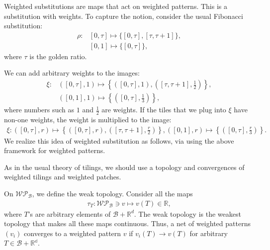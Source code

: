 \documentclass[a4]{amsart}
\newcommand{\WP}{\mathcal{W}\mathcal{P}}
\theoremstyle{definition}
\begin{document}
{\color{blue}Weighted substitutions
are maps that act on weighted patterns.
This is a substitution with weights.
To capture the notion, consider the
usual Fibonacci substitution:
\begin{align*}
    \rho\colon &[0,\tau]\mapsto \{[0,\tau],[\tau,\tau+1]\},\\
    &[0,1]\mapsto\{[0,\tau]\},
\end{align*}
where $\tau$ is the golden ratio.

We can add arbitrary weights to the images:
\begin{align*}
    \xi\colon &([0,\tau],1)\mapsto \left\{\left([0,\tau],1\right),\left([\tau,\tau+1],\frac{1}{2}\right)\right\},\\
    &([0,1],1)\mapsto\left\{\left([0,\tau],\frac{1}{3}\right)\right\},
\end{align*}
where numbers such as $1$ and $\frac{1}{2}$
are weights. If the tiles that we plug into
$\xi$ have non-one weights, the weight is
multiplied  to the image:
\begin{align}
    \xi\colon ([0,\tau],r)\mapsto \left\{\left([0,\tau],r\right),\left([\tau,\tau+1],\frac{r}{2}\right)\right\},
    ([0,1],r)\mapsto\left\{\left([0,\tau],\frac{r}{3}\right)\right\}.
    \label{eq_weighted_Fibonacci}
\end{align}
We realize this idea of weighted substitution as follows, via using the above
framework for weighted patterns. 

As in the usual theory of tilings,
we should use a topology and convergences
of weighted tilings and weighted patches.}
On $\WP_{\mathcal{B}}$, we define the weak topology. Consider all the maps
\begin{align*}
    \tau_{T}\colon \WP_{\mathcal{B}}\ni v\mapsto v(T)\in\mathbb{R},
\end{align*}
where $T$'s are arbitrary elements of $\mathcal{B}+\mathbb{R}^d$. The weak topology
is the weakest topology that makes all these maps continuous. {\color{blue}Thus,  a net of
weighted patterns $(v_i)$ converges to a
weighted pattern $v$ if $v_i(T)\rightarrow v(T)$ for arbitrary $T\in\mathcal{B}+\mathbb{R^d}$. }
\end{document}
